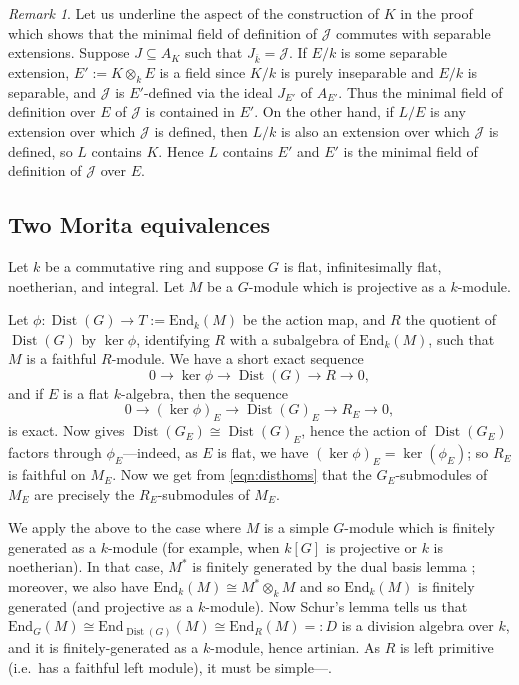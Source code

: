 \documentclass[11pt,reqno]{amsart}
\theoremstyle{definition}
\theoremstyle{remark}
\newtheorem{remark}[lemma]{Remark}
\theoremstyle{definition}
\theoremstyle{plain}
\DeclareMathOperator{\Dist}{Dist}
\newcommand{\End}{\mathrm{End}}
\newcommand{\bark}{{\overline{k}}}
\begin{document}
\begin{remark}\label{mfodsep}
Let us underline the aspect of the construction of $K$ in the proof which shows that the minimal field of definition of $\mathcal{J}$ commutes with separable extensions. Suppose $J\subseteq A_K$ such that $J_\bark=\mathcal{J}$.
If $E/k$ is some separable extension,  $E':=K\otimes_k E$ is a field since $K/k$ is purely inseparable and $E/k$ is separable, and $\mathcal{J}$ is $E'$-defined via the ideal $J_{E'}$ of $A_{E'}$.
Thus the minimal field of definition over $E$ of $\mathcal{J}$ is contained in $E'$.
On the other hand, if $L/E$ is any extension over which $\mathcal{J}$ is defined, then $L/k$ is also an extension over which $\mathcal{J}$ is defined, so $L$ contains $K$.
Hence $L$ contains $E'$ and $E'$ is the minimal field of definition of $\mathcal{J}$ over $E$. 
\end{remark}


\subsection{Two Morita equivalences}\label{sec:morita}
Let $k$ be a commutative ring and suppose $G$ is flat,  infinitesimally flat, noetherian, and integral. Let $M$ be a $G$-module which is projective as a $k$-module. 

Let $\phi:\Dist(G)\to T:=\End_k(M)$ be the action map, and $R$ the quotient of $\Dist(G)$ by $\ker \phi$, identifying $R$ with a subalgebra of $\End_k(M)$, such that $M$ is a faithful  $R$-module. We have a short exact sequence
\[0\to \ker\phi\to\Dist(G)\to R\to 0,\] 
and if $E$ is a flat $k$-algebra, then the sequence
\[0\to (\ker\phi)_E\to\Dist(G)_E\to R_E\to 0,\] 
is exact. Now \cite[I.7.4(1)]{Jan03} gives $\Dist(G_E)\cong \Dist(G)_E$, hence the action of $\Dist(G_E)$ factors through $\phi_E$---indeed, as $E$ is flat, we have $(\ker\phi)_E=\ker(\phi_E)$; so $R_E$ is faithful on $M_E$. 
Now we get from \cref{eqn:disthoms} that the $G_E$-submodules of $M_E$ are precisely the $R_E$-submodules of $M_E$.

We apply the above to the case where $M$ is a simple $G$-module which is finitely generated as a $k$-module (for example, when $k[G]$ is projective or $k$ is noetherian). In that case, $M^*$ is finitely generated by the dual basis lemma \cite[2.11]{Lam2}; moreover, we also have $\End_k(M)\cong M^*\otimes_k M$ \cite[Ex.~\S2.20]{Lam2} and so $\End_k(M)$ is finitely generated (and projective as a $k$-module). Now Schur's lemma tells us that $\End_G(M)\cong \End_{\Dist(G)}(M)\cong\End_R(M)=:D$ is a division algebra over $k$, and it is finitely-generated as a $k$-module, hence artinian. As $R$ is left primitive (i.e.~has a faithful left module), it must be simple---\!\!\cite[11.7]{Lam1}. 
\end{document}
